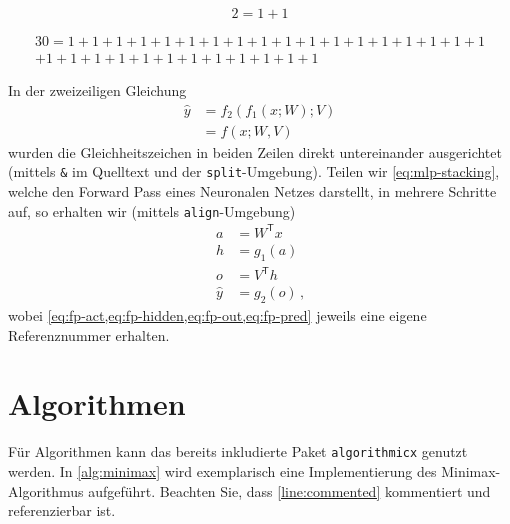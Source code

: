\begin{equation}
  \label{eq:example1}
  2 = 1 + 1
\end{equation}

\begin{multline}
  \label{eq:example2}
  30 = 1 + 1 + 1 + 1 + 1 + 1 + 1 + 1 + 1 + 1 + 1 + 1 + 1 + 1 + 1 + 1 + 1 + 1 \\
      + 1 + 1 + 1 + 1 + 1 + 1 + 1 + 1 + 1 + 1 + 1 + 1
\end{multline}

In der zweizeiligen Gleichung
\begin{equation}
  \label{eq:mlp-stacking}
  \begin{split}
    \hat{y} & = f_2(f_1(x; W); V) \\
            & = f(x; W, V)
  \end{split}
\end{equation}
wurden die Gleichheitszeichen in beiden Zeilen direkt untereinander ausgerichtet
(mittels \texttt{\&} im Quelltext und der \texttt{split}-Umgebung).
Teilen wir \cref{eq:mlp-stacking}, welche den Forward Pass eines Neuronalen
Netzes darstellt,
in mehrere Schritte auf, so erhalten wir (mittels \texttt{align}-Umgebung)
\begin{align}
  a       & = W^\mathsf{T} x \label{eq:fp-act} \\
  h       & = g_1(a) \label{eq:fp-hidden} \\
  o       & = V^\mathsf{T} h \label{eq:fp-out} \\
  \hat{y} & = g_2(o) \label{eq:fp-pred}
  \,\text{,}
\end{align}
wobei \cref{eq:fp-act,eq:fp-hidden,eq:fp-out,eq:fp-pred} jeweils eine eigene
Referenznummer erhalten.


\section{Algorithmen}

Für Algorithmen kann das bereits inkludierte Paket \texttt{algorithmicx}
genutzt werden.
In \cref{alg:minimax} wird exemplarisch eine Implementierung des
Minimax-Algorithmus aufgeführt.
Beachten Sie, dass \cref{line:commented} kommentiert und referenzierbar ist.

